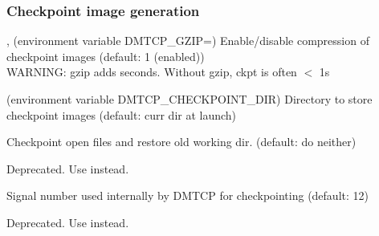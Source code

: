 \subsubsection{Checkpoint image generation}
\begin{Description}
  \item[\Opt{--gzip}, \Opt{--no-gzip} (environment variable DMTCP_GZIP=\Lbr01\Rbr)]
    Enable/disable compression of checkpoint images (default: 1 (enabled))\\
    WARNING:  gzip adds seconds.  Without gzip, ckpt is often $<$ 1s

  \item[\OptSArg{--ckptdir}{path} (environment variable DMTCP_CHECKPOINT_DIR)]
    Directory to store checkpoint images (default: curr dir at launch)

  \item[\Opt{--ckpt-open-files}]
    Checkpoint open files and restore old working dir. (default: do neither)

  \item[\Opt{--checkpoint-open-files}]
    Deprecated. Use  instead.

  \item[\OptSArg{--ckpt-signal}{signum}]
      Signal number used internally by DMTCP for checkpointing (default: 12)

  \item[\OptSArg{--mtcp-checkpoint-signal}{signum}]
    Deprecated. Use  instead.

\end{Description}

